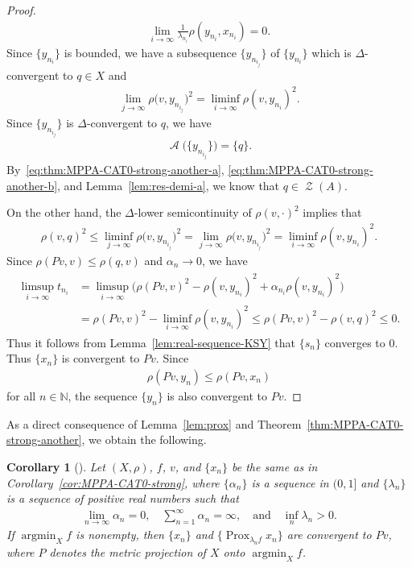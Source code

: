 \documentclass[draft]{amsart}
\numberwithin{equation}{section}
\def\N{\mathbb N}
\DeclareMathOperator*{\Argmin}{argmin}
\DeclareMathOperator{\AC}{\mathcal{A}}
\DeclareMathOperator{\Prox}{Prox}
\DeclareMathOperator{\Zer}{\mathcal{Z}}
\theoremstyle{plain}
\newtheorem{corollary}[theorem]{Corollary}
\theoremstyle{definition}
\theoremstyle{remark}
\begin{document}
\begin{proof}
\begin{align}
  \lim_{i\to \infty} \frac{1}{\lambda_{n_i}}\rho(y_{n_i}, x_{n_i})=0. 
 \end{align}
 Since $\{y_{n_i}\}$ is bounded, we have a subsequence $\{y_{n_{i_j}}\}$ of $\{y_{n_i}\}$ 
 which is $\Delta$-convergent to $q\in X$ and 
 \begin{align*}
  \lim_{j\to \infty} \rho\bigl(v, y_{n_{i_j}}\bigr)^2 = \liminf_{i\to \infty} \rho(v, y_{n_i})^2. 
 \end{align*}
 Since $\{y_{n_{i_j}}\}$ is $\Delta$-convergent to $q$, we have 
 \begin{align}\label{eq:thm:MPPA-CAT0-strong-another-b}
  \AC\bigl(\{y_{n_{i_j}}\}\bigr)=\{q\}.
 \end{align}
 By~\eqref{eq:thm:MPPA-CAT0-strong-another-a}, \eqref{eq:thm:MPPA-CAT0-strong-another-b}, and 
 Lemma~\ref{lem:res-demi-a}, we know that $q\in \Zer(A)$.

 On the other hand, the $\Delta$-lower semicontinuity of $\rho(v, \cdot)^2$ implies that 
 \begin{align*}
  \rho(v, q)^2 
  \leq \liminf_{j\to \infty}\rho\bigl(v, y_{n_{i_j}}\bigr)^2 
  =\lim_{j\to \infty}\rho\bigl(v, y_{n_{i_j}}\bigr)^2 
  =\liminf_{i\to \infty} \rho(v, y_{n_i})^2. 
 \end{align*}
 Since $\rho(Pv, v)\leq \rho(q, v)$ and $\alpha_n\to 0$, we have 
 \begin{align*}
  \begin{split}
   \limsup_{i\to \infty}t_{n_i}
   &=\limsup_{i\to \infty}\bigl(\rho(Pv, v)^2 -\rho(v, y_{n_i})^2 + \alpha_{n_i}\rho(v, y_{n_i})^2 \bigr) \\
   &=\rho(Pv, v)^2 -\liminf_{i\to \infty} \rho(v, y_{n_i})^2 
  \leq \rho(Pv, v)^2 - \rho(v, q)^2 \leq 0. 
  \end{split}
 \end{align*}
 Thus it follows from Lemma~\ref{lem:real-sequence-KSY} that 
 $\{s_n\}$ converges to $0$. Thus $\{x_n\}$ is convergent to $Pv$. Since 
 \begin{align*}
  \rho(Pv, y_n) \leq \rho(Pv, x_n)
 \end{align*}
 for all $n\in \N$, the sequence $\{y_n\}$ is also convergent to $Pv$. 
\end{proof}

As a direct consequence of Lemma~\ref{lem:prox} 
and Theorem~\ref{thm:MPPA-CAT0-strong-another}, we obtain the following. 

\begin{corollary}[\cite{MR3574140}]
 Let $(X, \rho)$, $f$, $v$, and $\{x_n\}$ be the 
 same as in Corollary~\ref{cor:MPPA-CAT0-strong}, 
 where $\{\alpha_n\}$ is a sequence in $(0,1]$ 
 and $\{\lambda_n\}$ is a sequence of positive real numbers such that 
 \begin{align*}
  \lim_{n\to \infty}\alpha_n = 0, \quad 
  \sum_{n=1}^{\infty}\alpha_n = \infty, 
  \quad \textrm{and} \quad 
  \inf_{n} \lambda_n >0. 
 \end{align*}
 If $\Argmin_X f$ is nonempty, then 
 $\{x_n\}$ and $\{\Prox_{\lambda_n f}x_n\}$ are convergent to $Pv$, where 
 $P$ denotes the metric projection of $X$ onto $\Argmin_X f$. 
\end{corollary}
\end{document}
